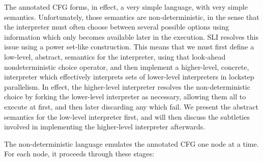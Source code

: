 The annotated CFG forms, in effect, a very simple language, with very simple semantics.
Unfortunately, those semantics are non-deterministic, in the sense that the interpreter must often choose between several possible options using information which only becomes available later in the execution.
SLI resolves this issue using a power set-like construction.
This means that we must first define a low-level, abstract, semantics for the interpreter, using that look-ahead nondeterministic choice operator, and then implement a higher-level, concrete, interpreter which effectively interprets sets of lower-level interpreters in lockstep parallelism.
In effect, the higher-level interpreter resolves the non-deterministic choice by forking the lower-level interpreter as necessary, allowing them all to execute at first, and then later discarding any which fail.
We present the abstract semantics for the low-level interpreter first, and will then discuss the subtleties involved in implementing the higher-level interpreter afterwards.

The non-deterministic language emulates the annotated CFG one node at a time.
For each node, it proceeds through these stages:

